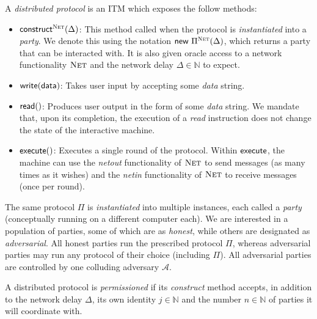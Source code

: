 \begin{definition}
  A \emph{distributed protocol} is an ITM which exposes the follow methods:

  \begin{itemize}
    \item $\textsf{construct}^\textsc{Net}(\Delta)$:
          This method called when the protocol is \emph{instantiated} into a
          \emph{party}. We denote this using the notation $\textsf{new}\,\,\Pi^\textsc{Net}(\Delta)$,
          which returns a party that can be interacted with.
          It is also given oracle access to a network functionality
          $\textsc{Net}$ and the network delay $\Delta \in \mathbb{N}$ to expect.
    \item $\textsf{write}(\textsf{data})$:
          Takes user input by accepting some \emph{data} string.
    \item $\textsf{read}()$:
          Produces user output in the form of some \emph{data} string.
          We mandate that,
          upon its completion, the execution of a \emph{read} instruction
          does not change the state of the interactive machine.
    \item $\textsf{execute}()$:
          Executes a single round of the protocol.
          Within $\textsf{execute}$, the machine can
          use the \emph{netout} functionality of $\textsc{Net}$ to send messages
          (as many times as it wishes)
          and the \emph{netin} functionality of $\textsc{Net}$ to receive messages
          (once per round).
  \end{itemize}
\end{definition}

The same protocol $\Pi$ is \emph{instantiated} into multiple instances,
each called a \emph{party} (conceptually running on a different computer each).
We are interested in a population of parties, some of which are
as \emph{honest}, while others are designated as \emph{adversarial}.
All honest parties run the prescribed protocol $\Pi$, whereas adversarial
parties may run any protocol of their choice (including $\Pi$).
All adversarial parties are controlled by one colluding adversary $\mathcal{A}$.

\begin{definition}
  A distributed protocol is \emph{permissioned} if its \emph{construct}
  method accepts, in addition to the network delay $\Delta$,
  its own identity $j \in \mathbb{N}$
  and the number $n \in \mathbb{N}$ of parties it will coordinate with.
\end{definition}

